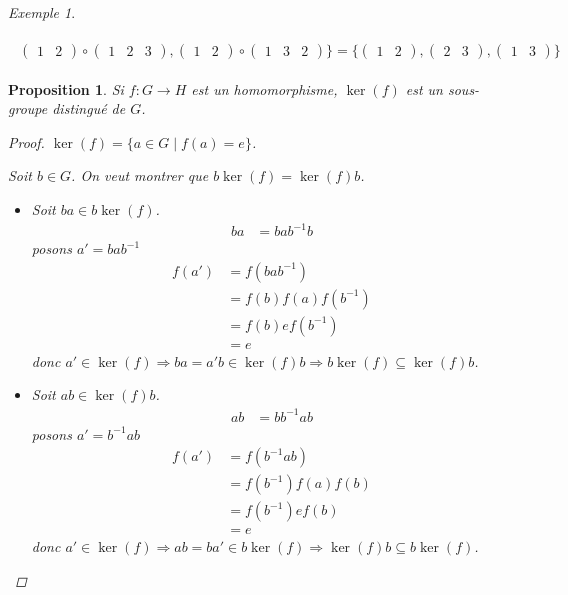 \documentclass{report}
\newtheorem*{prop}{Proposition}
\theoremstyle{definition}
\theoremstyle{remark}
\newtheorem*{exem}{Exemple}
\begin{document}
\begin{exem}
\begin{ulist}
\begin{align*}
\begin{split}
\begin{pmatrix}
						1&2
					\end{pmatrix} \circ \begin{pmatrix}
						1&2&3
					\end{pmatrix}, \begin{pmatrix}
						1&2
					\end{pmatrix} \circ \begin{pmatrix}
						1&3&2
					\end{pmatrix}\} = \{\begin{pmatrix}
						1&2
					\end{pmatrix}, \begin{pmatrix}
						2&3
					\end{pmatrix}, \begin{pmatrix}
						1&3
					\end{pmatrix}\}
				\end{split}
			\end{align*}
		\end{ulist}
	\end{exem}
	\begin{prop}
		Si $f:G \to H$ est un homomorphisme, $\ker(f)$ est un sous-groupe distingu\'e de $G$.
		\begin{proof}
			$\ker(f) = \{a \in G \mid f(a)=e\}$.

			Soit $b \in G$. On veut montrer que $b\ker(f)=\ker(f)b$.
			\begin{itemize}
				\item[$(\subseteq)$] Soit $ba \in b\ker(f)$.
				\begin{align*}
					ba&= bab^{-1}b
				\end{align*}
				posons $a'=bab^{-1}$
				\begin{align*}
					f(a')&= f(bab^{-1})\\
					&= f(b)f(a)f(b^{-1})\\
					&= f(b)ef(b^{-1})\\
					&= e
				\end{align*}
				donc $a' \in \ker(f) \Rightarrow ba=a'b \in \ker(f)b \Rightarrow b\ker(f) \subseteq \ker(f)b$.
				\item[$(\supseteq)$] Soit $ab \in \ker(f)b$.
				\begin{align*}
					ab&= bb^{-1}ab
				\end{align*}
				posons $a'=b^{-1}ab$
				\begin{align*}
					f(a')&= f(b^{-1}ab)\\
					&= f(b^{-1})f(a)f(b)\\
					&= f(b^{-1})ef(b)\\
					&= e
				\end{align*}
				donc $a' \in \ker(f) \Rightarrow ab=ba' \in b\ker(f) \Rightarrow \ker(f)b \subseteq b\ker(f)$.
			\end{itemize}
		\end{proof}
	\end{prop}
\end{document}
